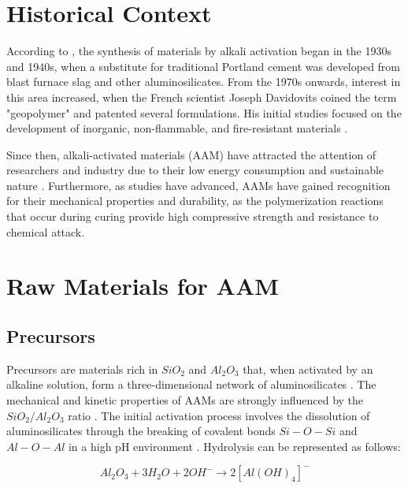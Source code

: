 \section{Historical Context}

According to \cite{pachecotorgal2014handbook}, the synthesis of materials by alkali activation began in the 1930s and 1940s, when a substitute for traditional Portland cement was developed from blast furnace slag and other aluminosilicates.
From the 1970s onwards, interest in this area increased, when the French scientist Joseph Davidovits coined the term "geopolymer" and patented several formulations. His initial studies focused on the development of inorganic, non-flammable, and fire-resistant materials \cite{provis2009geopolymers}.


Since then, alkali-activated materials (AAM) have attracted the attention of researchers and industry due to their low energy consumption and sustainable nature \cite{qin2022onepart}.
Furthermore, as studies have advanced, AAMs have gained recognition for their mechanical properties and durability, as the polymerization reactions that occur during curing provide high compressive strength and resistance to chemical attack.

\section{Raw Materials for AAM}

\subsection{Precursors}

Precursors are materials rich in $SiO_2$ and $Al_2O_3$ that, when activated by an alkaline solution, form a three-dimensional network of aluminosilicates \cite{rakhimova2019metakaolin}.
The mechanical and kinetic properties of AAMs are strongly influenced by the $SiO_2/Al_2O_3$ ratio \cite{provis2007geopolymerisation}.
The initial activation process involves the dissolution of aluminosilicates through the breaking of covalent bonds $Si-O-Si$ and $Al-O-Al$ in a high pH environment \cite{Severo2013}. Hydrolysis can be represented as follows:

\begin{equation}
  Al_2O_3 + 3H_2O + 2OH^- \rightarrow 2\left[Al(OH)_4\right]^- 
\end{equation}

